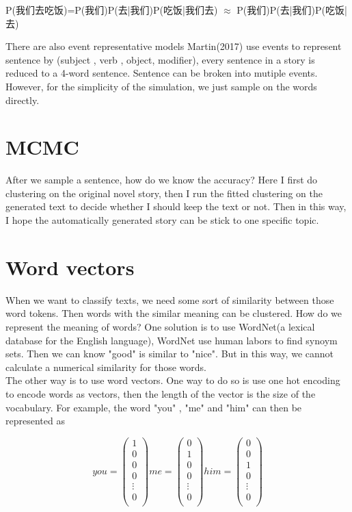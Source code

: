 \documentclass{article}
\begin{document}
\qquad  P(我们去吃饭)=P(我们)P(去|我们)P(吃饭|我们去)  $\approx$ P(我们)P(去|我们)P(吃饭|去) 

There are also event representative models
Martin(2017) use events to represent sentence by (subject , verb , object, modifier), every sentence in a story is reduced to a 4-word sentence. Sentence can be broken into mutiple events. 
 \cite{Event representations for automated story generation}
However, for the simplicity of the simulation, we just sample on the words directly. 

\section{MCMC}
After we sample a sentence, how do we know the accuracy? Here I first do clustering on the original novel story, then I run the fitted clustering on the generated text to decide whether I should keep the text or not. Then in this way, I hope the automatically generated story can be stick to one specific topic.

\section{Word vectors}
When we want to classify texts, we need some sort of similarity between those word tokens. Then words with the similar meaning can be clustered.
How do we represent the meaning of words? One solution is to use WordNet(a lexical database for the English language), WordNet use human labors to find synoym sets.  Then we can know "good" is similar to "nice".  But in this way, we cannot calculate a numerical similarity for those words. 
$$$$
The other way is to use word vectors. One way to do so is use one hot encoding to encode words as vectors, then the length of the vector is the size of the vocabulary. For example, the word "you" , "me" and "him" can then be represented as

$$
you =
\begin{pmatrix}
1 \\
0 \\
0 \\
0\\
\vdots \\
0 \\
\end{pmatrix}
me=
\begin{pmatrix}
0 \\
1\\
0 \\
0\\
\vdots \\
0 \\
\end{pmatrix}
him=
\begin{pmatrix}
0 \\
0\\
1 \\
0\\
\vdots \\
0 \\
\end{pmatrix}
$$
\end{document}
